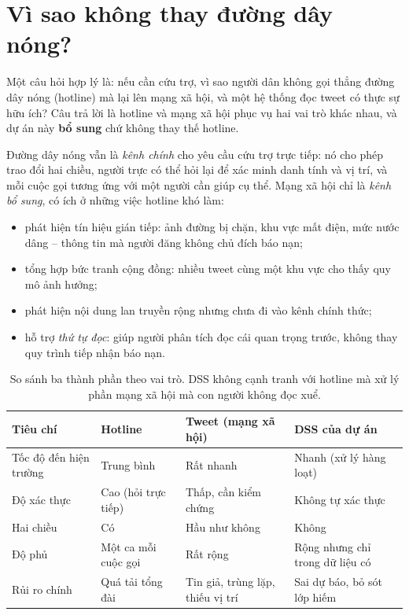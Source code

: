 \section{Vì sao không thay đường dây nóng?}
\label{sec:hotline}

Một câu hỏi hợp lý là: nếu cần cứu trợ, vì sao người dân không gọi thẳng đường
dây nóng (hotline) mà lại lên mạng xã hội, và một hệ thống đọc tweet có thực sự
hữu ích? Câu trả lời là hotline và mạng xã hội phục vụ hai vai trò khác nhau, và
dự án này \textbf{bổ sung} chứ không thay thế hotline.

Đường dây nóng vẫn là \emph{kênh chính} cho yêu cầu cứu trợ trực tiếp: nó cho
phép trao đổi hai chiều, người trực có thể hỏi lại để xác minh danh tính và vị
trí, và mỗi cuộc gọi tương ứng với một người cần giúp cụ thể. Mạng xã hội chỉ là
\emph{kênh bổ sung}, có ích ở những việc hotline khó làm:

\begin{itemize}[leftmargin=*]
  \item phát hiện tín hiệu gián tiếp: ảnh đường bị chặn, khu vực mất điện, mức
        nước dâng -- thông tin mà người đăng không chủ đích báo nạn;
  \item tổng hợp bức tranh cộng đồng: nhiều tweet cùng một khu vực cho thấy quy
        mô ảnh hưởng;
  \item phát hiện nội dung lan truyền rộng nhưng chưa đi vào kênh chính thức;
  \item hỗ trợ \emph{thứ tự đọc}: giúp người phân tích đọc cái quan trọng trước,
        không thay quy trình tiếp nhận báo nạn.
\end{itemize}

\begin{table}[H]
\centering
\small
\caption{So sánh ba thành phần theo vai trò. DSS không cạnh tranh với hotline mà
xử lý phần mạng xã hội mà con người không đọc xuể.}
\label{tab:hotline-vs-social}
\begin{tabularx}{\textwidth}{p{3cm}XXX}
\toprule
\textbf{Tiêu chí} & \textbf{Hotline} & \textbf{Tweet (mạng xã hội)} &
\textbf{DSS của dự án}\\
\midrule
Tốc độ đến hiện trường & Trung bình & Rất nhanh & Nhanh (xử lý hàng loạt)\\
Độ xác thực & Cao (hỏi trực tiếp) & Thấp, cần kiểm chứng & Không tự xác thực\\
Hai chiều & Có & Hầu như không & Không\\
Độ phủ & Một ca mỗi cuộc gọi & Rất rộng & Rộng nhưng chỉ trong dữ liệu có\\
Rủi ro chính & Quá tải tổng đài & Tin giả, trùng lặp, thiếu vị trí &
Sai dự báo, bỏ sót lớp hiếm\\
\bottomrule
\end{tabularx}
\end{table}

